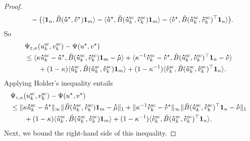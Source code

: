 \begin{proof}
\begin{align*}
&\qquad - \big(\inr{\mathbf 1_n, \tilde{B}(\dt{u}^{\star} ,\dt{v}^{\star})\mathbf 1_m}  
- \inr{\dt{u}^{\star{}}, \tilde{B}(\dt{u}^{\text{sc}}_k ,\dt{v}^{\text{sc}}_k)\mathbf 1_m} 
- \inr{\dt{v}^\star, \tilde{B}(\dt{u}^{\text{sc}}_k ,\dt{v}^{\text{sc}}_k)^\top \mathbf 1_n} \big).
\end{align*}
So
\begin{align*}
&\Psi_{\varepsilon, \kappa} (u^{\text{sc}}_k ,v^{\text{sc}}_k) -\Psi(u^\star, v^\star)\\
&\leq  \inr{\kappa \dt{u}^{\text{sc}}_k - \dt{u}^{\star}, \tilde{B}(\dt{u}^{\text{sc}}_k ,\dt{v}^{\text{sc}}_k)\mathbf 1_m - \dt{\mu}} +\inr{\kappa^{-1}\dt{v}^{\text{sc}}_k - \dt{v}^{\star}, \tilde{B}(\dt{u}^{\text{sc}}_k ,\dt{v}^{\text{sc}}_k)^\top\mathbf 1_n - \dt{\nu}}\\
&\qquad + (1- \kappa)\inr{\dt{u}^{\text{sc}}_k ,\tilde{B}(\dt{u}^{\text{sc}}_k ,\dt{v}^{\text{sc}}_k)\mathbf 1_m} + (1- \kappa^{-1})\inr{\dt{v}^{\text{sc}}_k ,\tilde{B}(\dt{u}^{\text{sc}}_k ,\dt{v}^{\text{sc}}_k)^\top\mathbf 1_n}.
\end{align*}
Applying Holder's inequality entails
\begin{align*}
&\Psi_{\varepsilon, \kappa}(u^{\text{sc}}_k ,v^{\text{sc}}_k) -\Psi(u^\star, v^\star)\\
&\leq \norm{\kappa \dt{u}^{\text{sc}}_k - \dt{u}^\star}_\infty \norm{\tilde{B}(\dt{u}^{\text{sc}}_k ,\dt{v}^{\text{sc}}_k)\mathbf 1_m - \dt{\mu}}_1 + \norm{\kappa^{-1}\dt{v}^{\text{sc}}_k - \dt{v}^\star}_\infty \norm{\tilde{B}(\dt{u}^{\text{sc}}_k ,\dt{v}^{\text{sc}}_k)^\top\mathbf 1_n - \dt{\nu}}_1\\
&\qquad + (1- \kappa)\inr{\dt{u}^{\text{sc}}_k ,\tilde{B}(\dt{u}^{\text{sc}}_k ,\dt{v}^{\text{sc}}_k)\mathbf 1_m} + (1- \kappa^{-1})\inr{\dt{v}^{\text{sc}}_k ,\tilde{B}(\dt{u}^{\text{sc}}_k ,\dt{v}^{\text{sc}}_k)^\top\mathbf 1_n}.
\end{align*}
Next, we bound the right-hand side of this inequality.


\end{proof}

